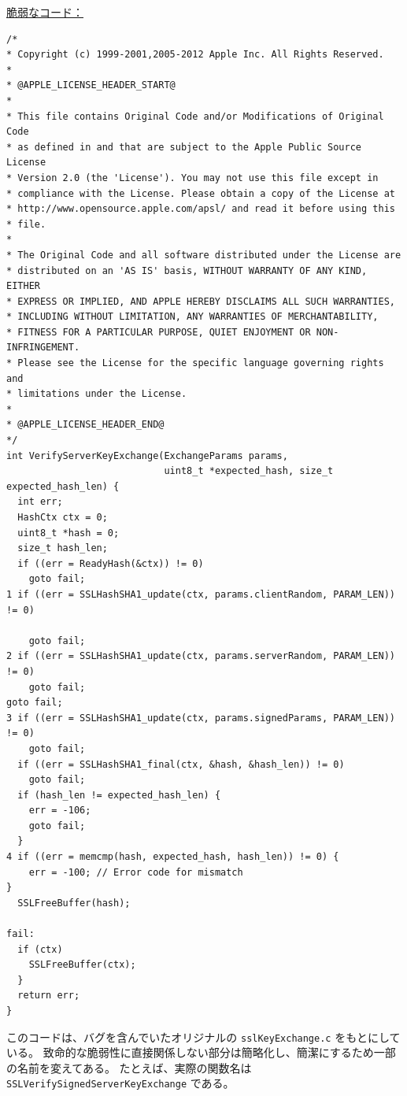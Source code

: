 \documentclass[uplatex]{jsarticle}
\def\label#1{}%
\begin{document}
\noindent\underline{脆弱なコード：}
\begin{verbatim}
/*
* Copyright (c) 1999-2001,2005-2012 Apple Inc. All Rights Reserved.
*
* @APPLE_LICENSE_HEADER_START@
*
* This file contains Original Code and/or Modifications of Original Code
* as defined in and that are subject to the Apple Public Source License
* Version 2.0 (the 'License'). You may not use this file except in
* compliance with the License. Please obtain a copy of the License at
* http://www.opensource.apple.com/apsl/ and read it before using this
* file.
*
* The Original Code and all software distributed under the License are
* distributed on an 'AS IS' basis, WITHOUT WARRANTY OF ANY KIND, EITHER
* EXPRESS OR IMPLIED, AND APPLE HEREBY DISCLAIMS ALL SUCH WARRANTIES,
* INCLUDING WITHOUT LIMITATION, ANY WARRANTIES OF MERCHANTABILITY,
* FITNESS FOR A PARTICULAR PURPOSE, QUIET ENJOYMENT OR NON-INFRINGEMENT.
* Please see the License for the specific language governing rights and
* limitations under the License.
*
* @APPLE_LICENSE_HEADER_END@
*/
int VerifyServerKeyExchange(ExchangeParams params,
                            uint8_t *expected_hash, size_t expected_hash_len) {
  int err;
  HashCtx ctx = 0;
  uint8_t *hash = 0;
  size_t hash_len;
  if ((err = ReadyHash(&ctx)) != 0)
    goto fail;
1 if ((err = SSLHashSHA1_update(ctx, params.clientRandom, PARAM_LEN)) != 0)

    goto fail;
2 if ((err = SSLHashSHA1_update(ctx, params.serverRandom, PARAM_LEN)) != 0)
    goto fail;
goto fail;
3 if ((err = SSLHashSHA1_update(ctx, params.signedParams, PARAM_LEN)) != 0)
    goto fail;
  if ((err = SSLHashSHA1_final(ctx, &hash, &hash_len)) != 0)
    goto fail;
  if (hash_len != expected_hash_len) {
    err = -106;
    goto fail;
  }
4 if ((err = memcmp(hash, expected_hash, hash_len)) != 0) {
    err = -100; // Error code for mismatch
}
  SSLFreeBuffer(hash);

fail:
  if (ctx)
    SSLFreeBuffer(ctx);
  }
  return err;
}
\end{verbatim}

\begin{rem}[コードの出典]\label{rem:ch12-gotofail-source}
このコードは、バグを含んでいたオリジナルの \texttt{sslKeyExchange.c} をもとにしている。
致命的な脆弱性に直接関係しない部分は簡略化し、簡潔にするため一部の名前を変えてある。
たとえば、実際の関数名は \texttt{SSLVerifySignedServerKeyExchange} である。
\end{rem}
\end{document}
